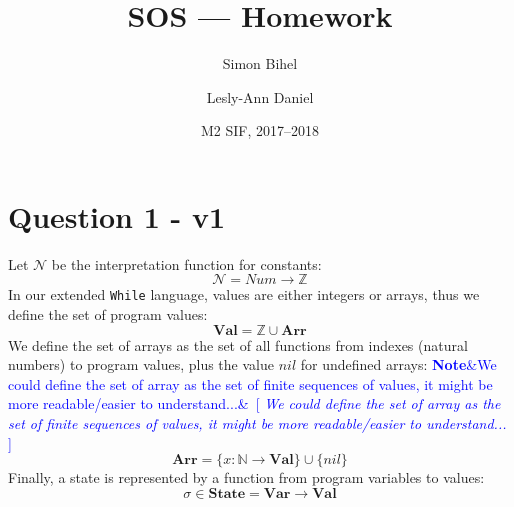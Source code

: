 \documentclass{article}
\title{SOS --- Homework}
\author{Simon Bihel \and Lesly-Ann Daniel}
\date{M2 SIF, 2017--2018}
\newcommand{\note}[1]{\textcolor{blue}{\textbf{Note}\ifx&#1&\else ~[ \emph{#1} ]~\fi}}
\begin{document}
\maketitle

\section*{Question 1 - v1}
Let \(\mathcal{N}\) be the interpretation function for constants:
\[ \mathcal{N} = Num \rightarrow \mathbb{Z} \]
In our extended \texttt{While} language, values are either integers or arrays, thus we define the set of program values:
\[ \textbf{Val} = \mathbb{Z} \cup \textbf{Arr}\]
We define the set of arrays as the set of all functions from indexes (natural numbers) to program values, plus the value \(nil\) for undefined arrays: \note{We could define the set of array as the set of finite sequences of values, it might be more readable/easier to understand...}
\[\textbf{Arr} = \{x:\mathbb{N} \rightarrow \textbf{Val}\} \cup \{nil\} \]
Finally, a state is represented by a function from program variables to values:
\[\sigma \in \textbf{State} = \textbf{Var} \rightarrow \textbf{Val} \]

\end{document}
